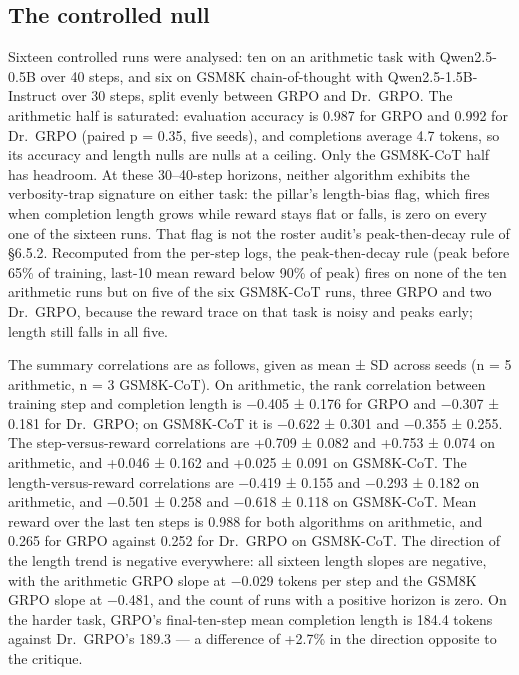 \documentclass[12pt,a4paper]{report}
\begin{document}
\subsection{The controlled null}\label{the-controlled-null}

Sixteen controlled runs were analysed: ten on an arithmetic task with
Qwen2.5-0.5B over 40 steps, and six on GSM8K chain-of-thought with
Qwen2.5-1.5B-Instruct over 30 steps, split evenly between GRPO and
Dr.~GRPO. The arithmetic half is saturated: evaluation accuracy is 0.987
for GRPO and 0.992 for Dr.~GRPO (paired p = 0.35, five seeds), and
completions average 4.7 tokens, so its accuracy and length nulls are
nulls at a ceiling. Only the GSM8K-CoT half has headroom. At these
30--40-step horizons, neither algorithm exhibits the verbosity-trap
signature on either task: the pillar's length-bias flag, which fires
when completion length grows while reward stays flat or falls, is zero
on every one of the sixteen runs. That flag is not the roster audit's
peak-then-decay rule of §6.5.2. Recomputed from the per-step logs, the
peak-then-decay rule (peak before 65\% of training, last-10 mean reward
below 90\% of peak) fires on none of the ten arithmetic runs but on five
of the six GSM8K-CoT runs, three GRPO and two Dr.~GRPO, because the
reward trace on that task is noisy and peaks early; length still falls
in all five.

The summary correlations are as follows, given as mean ± SD across seeds
(n = 5 arithmetic, n = 3 GSM8K-CoT). On arithmetic, the rank correlation
between training step and completion length is −0.405 ± 0.176 for GRPO
and −0.307 ± 0.181 for Dr.~GRPO; on GSM8K-CoT it is −0.622 ± 0.301 and
−0.355 ± 0.255. The step-versus-reward correlations are +0.709 ± 0.082
and +0.753 ± 0.074 on arithmetic, and +0.046 ± 0.162 and +0.025 ± 0.091
on GSM8K-CoT. The length-versus-reward correlations are −0.419 ± 0.155
and −0.293 ± 0.182 on arithmetic, and −0.501 ± 0.258 and −0.618 ± 0.118
on GSM8K-CoT. Mean reward over the last ten steps is 0.988 for both
algorithms on arithmetic, and 0.265 for GRPO against 0.252 for Dr.~GRPO
on GSM8K-CoT. The direction of the length trend is negative everywhere:
all sixteen length slopes are negative, with the arithmetic GRPO slope
at −0.029 tokens per step and the GSM8K GRPO slope at −0.481, and the
count of runs with a positive horizon is zero. On the harder task,
GRPO's final-ten-step mean completion length is 184.4 tokens against
Dr.~GRPO's 189.3 --- a difference of +2.7\% in the direction opposite to
the critique.
\end{document}
